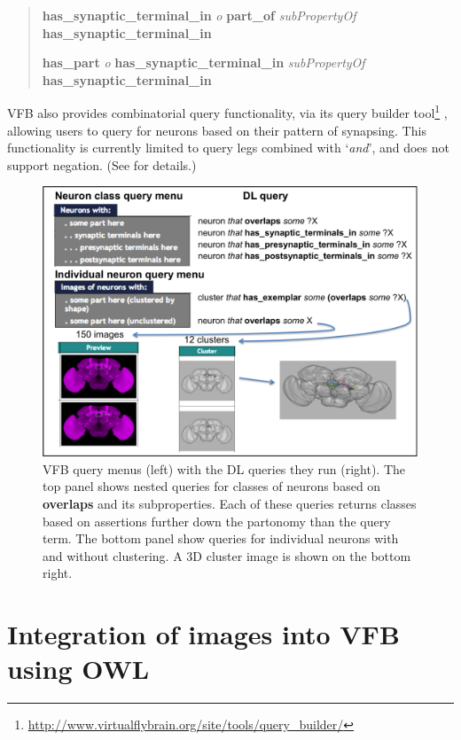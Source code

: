 \documentclass[runningheads,a4paper]{llncs}
\begin{document}
\begin{quote}
\textbf{has\_synaptic\_terminal\_in} \textit{o} \textbf{part\_of} \textit{subPropertyOf}
\textbf{has\_synaptic\_terminal\_in}

\textbf{has\_part} \textit{o} \textbf{has\_synaptic\_terminal\_in} \textit{subPropertyOf}
\textbf{has\_synaptic\_terminal\_in}
\end{quote}

VFB also provides combinatorial query functionality, via its
query builder
tool\footnote{\url{http://www.virtualflybrain.org/site/tools/query_builder/}}
,
allowing users to query for neurons based on their pattern of
synapsing.  This functionality is currently limited to query legs
combined with `\textit {and}', and does not support negation.
(See \cite{pmid22402613} for details.)

\begin{figure}
\centering
\includegraphics[width=120mm]{images/Query_menus_DL_images.png}
\caption{VFB query menus (left) with the DL queries they run (right).  The top panel
  shows nested queries for classes of neurons based on \textbf{overlaps} and its
  subproperties.  Each of these queries returns classes based on
  assertions further down the partonomy than the query term.  The
  bottom panel show queries for individual neurons with and without
  clustering.  A 3D cluster image is shown on the bottom right. }
\label{fig:Query_menus_DL_images}
\end{figure}

\section{Integration of images into VFB using OWL}
\end{document}
